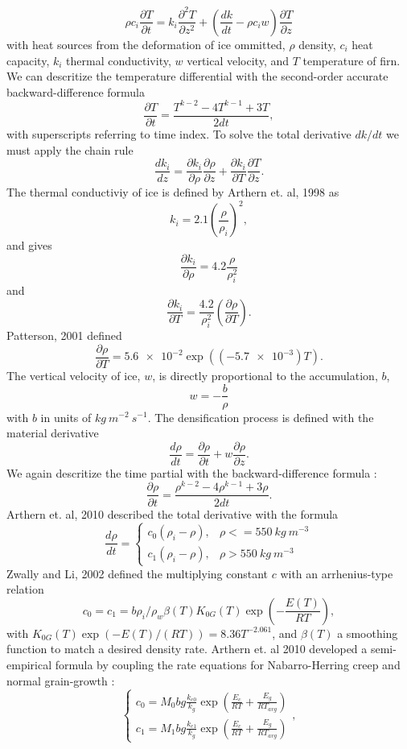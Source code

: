 \documentclass{article}%
\begin{document}
  $$
  \rho c_i \frac{\partial T}{\partial t} = 
    k_i \frac{\partial^2 T}{\partial z^2} +
    \left( \frac{dk}{dt} - \rho c_i w \right) \frac{\partial T}{\partial z}
  $$
with heat sources from the deformation of ice ommitted, $\rho$ density, $c_i$ heat capacity, $k_i$ thermal conductivity, $w$ vertical velocity, and $T$ temperature of firn.  We can descritize the temperature differential with the second-order accurate backward-difference formula
  $$\frac{\partial T}{\partial t} = \frac{T^{k-2} - 4T^{k-1} + 3T}{2dt},$$
with superscripts referring to time index.
To solve the total derivative $dk/dt$ we must apply the chain rule
  $$
  \frac{dk_i}{dz} = 
  \frac{\partial k_i}{\partial \rho} \frac{\partial \rho}{\partial z} + 
  \frac{\partial k_i}{\partial T} \frac{\partial T}{\partial z}.
  $$
The thermal conductiviy of ice is defined by Arthern et. al, 1998 as
  $$k_i = 2.1 \left(\frac{\rho}{\rho_i}\right)^2,$$
and gives
  $$
  \frac{\partial k_i}{\partial \rho} = 
    4.2 \frac{\rho}{\rho_i^2}
  $$
and
  $$
  \frac{\partial k_i}{\partial T} = 
    \frac{4.2}{\rho_i^2} \left( \frac{\partial \rho}{\partial T} \right).
  $$
Patterson, 2001 defined 
  $$
  \frac{\partial \rho}{\partial T} = 
    \SI{5.6e-2} \exp ((\SI{-5.7e-3})T).
  $$
The vertical velocity of ice, $w$, is directly proportional to the accumulation, $b$,
  $$
  w = -\frac{b}{\rho}
  $$
with $b$ in units of $kg\ m^{-2}\ s^{-1}$.  The densification process is defined with the material derivative
  $$\frac{d \rho}{dt} = \frac{\partial \rho}{\partial t} + 
    w\frac{\partial \rho}{\partial z}.$$
We again descritize the time partial with the backward-difference formula :
  $$\frac{\partial \rho}{\partial t} = 
      \frac{\rho^{k-2} - 4\rho^{k-1} + 3\rho}{2dt}.$$
Arthern et. al, 2010 described the total derivative with the formula  
  $$
  \frac{d \rho}{dt} = 
  \begin{cases}
   c_0(\rho_i - \rho), &\rho <= 550\ kg\ m^{-3}\\
   c_1(\rho_i - \rho), &\rho > 550\ kg\ m^{-3}
  \end{cases}$$
Zwally and Li, 2002 defined the multiplying constant $c$ with an arrhenius-type relation
  $$
  c_0 = c_1 = 
  b \rho_i / \rho_w \beta(T)K_{0G}(T)\exp \left( -\frac{E(T)}{RT} \right),
  $$
with $K_{0G}(T) \exp(-E(T)/(RT)) = 8.36T^{-2.061}$, and $\beta(T)$ a smoothing function to match a desired density rate.  Arthern et. al 2010 developed a semi-empirical formula by coupling the rate equations for Nabarro-Herring creep and normal grain-growth : 
  $$
  \begin{cases}
    c_0 = M_0 bg\frac{k_{c0}}{k_g}\exp\left(\frac{E_c}{RT} + 
          \frac{E_g}{RT_{avg}}\right)\\
    c_1 = M_1 bg\frac{k_{c1}}{k_g}\exp\left(\frac{E_c}{RT} + 
          \frac{E_g}{RT_{avg}}\right)
  \end{cases},
  $$
\end{document}
